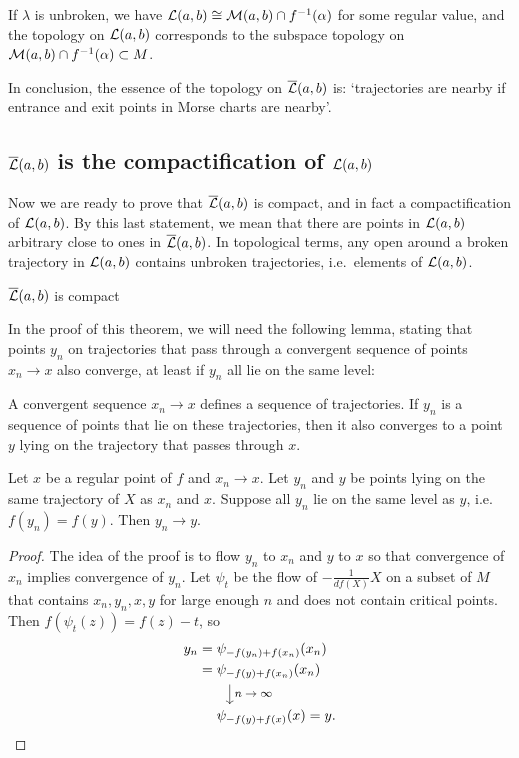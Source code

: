 \begin{remark}
    If $\lambda$ is unbroken, we have $\mathcal L(a, b) \cong \mathcal M(a, b) \cap  f^{-1}(\alpha)$ for some regular value, and the topology on $\mathcal L(a, b)$ corresponds to the subspace topology on $\mathcal M(a, b) \cap  f^{-1}(\alpha) \subset M$.
\end{remark}

In conclusion, the essence of the topology on $\overline{\mathcal L}(a, b)$ is: `trajectories are nearby if entrance and exit points in Morse charts are nearby'.

\subsection{$\overline{\mathcal L}(a, b)$ is the compactification of $\mathcal L(a, b)$}
Now we are ready to prove that $\overline{\mathcal L}(a, b)$ is compact, and in fact a compactification of  $\mathcal L(a, b)$. By this last statement, we mean that there are points in $\mathcal L(a, b)$ arbitrary close to ones in  $\overline{\mathcal L}(a, b)$.
In topological terms, any open around a broken trajectory in $\mathcal L(a, b)$ contains unbroken trajectories, i.e.\ elements of $\mathcal L(a, b)$.
\begin{theorem}
    $\overline{\mathcal L}(a, b)$ is compact
\end{theorem}

In the proof of this theorem, we will need the following lemma, stating that points $y_n$ on trajectories that pass through a convergent sequence of points $x_n \to x$ also converge, at least if $y_n$ all lie on the same level:
\begin{marginfigure}
    \centering
    \caption{A convergent sequence $x_n \to  x$ defines a sequence of trajectories. If $y_n$ is a sequence of points that lie on these trajectories, then it also converges to a point $y$ lying on the trajectory that passes through $x$.}
    \label{fig:lemma-partial-squared-zero-proof}
\end{marginfigure}
\begin{lemma}
    Let $x$ be a regular point of $f$ and $x_n \to x$.
    Let $y_n$ and  $y$ be points lying on the same trajectory of $X$ as  $x_n$ and  $x$.
    Suppose all $y_n$ lie on the same level as  $y$, i.e.  $f(y_n) = f(y)$.
    Then  $y_n \to  y$.
    \label{lemma:level-sets}
\end{lemma}
\begin{proof}
    The idea of the proof is to flow $y_n$ to  $x_n$ and $y$ to $x$ so that convergence of $x_n$ implies convergence of $y_n$.
    Let  $\psi_t$ be the flow of  $-\frac{1}{df (X)} X$ on a subset of $M$ that contains $x_n, y_n, x, y$ for large enough  $n$ and does not contain critical points.
    Then $f(\psi_t(z)) = f(z) - t$, so
     \begin{align*}
         y_n &= \psi_{-f(y_n) + f(x_n)}(x_n)\\
         &= \psi_{-f(y) + f(x_n)}(x_n)\\
         & \qquad \tikz \draw[->]  (0,0) -- (0,-0.5) node[midway, right]{\footnotesize$n \to  \infty$};\\[-0.4em]
         &\mbox{}\phantom{{}={}}\psi_{-f(y) + f(x)}(x) = y
    .\end{align*} 
\end{proof}

